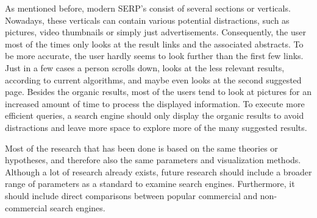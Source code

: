 As mentioned before, modern SERP's consist of several sections or verticals. Nowadays, these verticals can contain various potential distractions, such as pictures, video thumbnails or simply just advertisements.   
Consequently, the user most of the times only looks at the result links and the associated abstracts. To be more accurate, the user hardly seems to look further than the first few links. Just in a few cases a person scrolls down, looks at the less relevant results, according to current algorithms, and maybe even looks at the second suggested page.
Besides the organic results, most of the users tend to look at pictures for an increased amount of time to process the displayed information.
To execute more efficient queries, a search engine should only display the organic results to avoid distractions and leave more space to explore more of the many suggested results.

Most of the research that has been done is based on the same theories or hypotheses, and therefore also the same parameters and visualization methods. 
Although a lot of research already exists, future research should include a broader range of parameters as a standard to examine search engines. Furthermore, it should include direct comparisons between popular commercial and non-commercial search engines.



